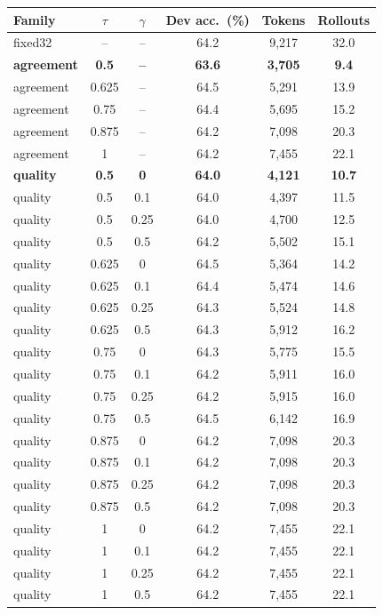 \begin{tabular}{lccccc}
\toprule
Family & $\tau$ & $\gamma$ & Dev acc.\ (\%) & Tokens & Rollouts \\
\midrule
fixed32 & -- & -- & 64.2 & 9,217 & 32.0 \\
\textbf{agreement} & \textbf{0.5} & \textbf{--} & \textbf{63.6} & \textbf{3,705} & \textbf{9.4} \\
agreement & 0.625 & -- & 64.5 & 5,291 & 13.9 \\
agreement & 0.75 & -- & 64.4 & 5,695 & 15.2 \\
agreement & 0.875 & -- & 64.2 & 7,098 & 20.3 \\
agreement & 1 & -- & 64.2 & 7,455 & 22.1 \\
\textbf{quality} & \textbf{0.5} & \textbf{0} & \textbf{64.0} & \textbf{4,121} & \textbf{10.7} \\
quality & 0.5 & 0.1 & 64.0 & 4,397 & 11.5 \\
quality & 0.5 & 0.25 & 64.0 & 4,700 & 12.5 \\
quality & 0.5 & 0.5 & 64.2 & 5,502 & 15.1 \\
quality & 0.625 & 0 & 64.5 & 5,364 & 14.2 \\
quality & 0.625 & 0.1 & 64.4 & 5,474 & 14.6 \\
quality & 0.625 & 0.25 & 64.3 & 5,524 & 14.8 \\
quality & 0.625 & 0.5 & 64.3 & 5,912 & 16.2 \\
quality & 0.75 & 0 & 64.3 & 5,775 & 15.5 \\
quality & 0.75 & 0.1 & 64.2 & 5,911 & 16.0 \\
quality & 0.75 & 0.25 & 64.2 & 5,915 & 16.0 \\
quality & 0.75 & 0.5 & 64.5 & 6,142 & 16.9 \\
quality & 0.875 & 0 & 64.2 & 7,098 & 20.3 \\
quality & 0.875 & 0.1 & 64.2 & 7,098 & 20.3 \\
quality & 0.875 & 0.25 & 64.2 & 7,098 & 20.3 \\
quality & 0.875 & 0.5 & 64.2 & 7,098 & 20.3 \\
quality & 1 & 0 & 64.2 & 7,455 & 22.1 \\
quality & 1 & 0.1 & 64.2 & 7,455 & 22.1 \\
quality & 1 & 0.25 & 64.2 & 7,455 & 22.1 \\
quality & 1 & 0.5 & 64.2 & 7,455 & 22.1 \\
\bottomrule
\end{tabular}